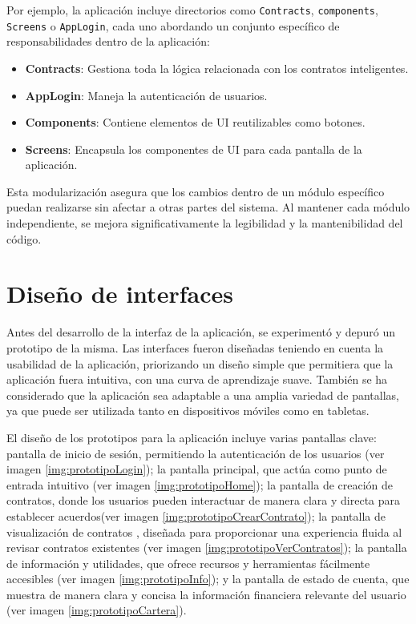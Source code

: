 Por ejemplo, la aplicación incluye directorios como \texttt{Contracts}, \texttt{components}, \texttt{Screens} o \texttt{AppLogin}, cada uno abordando un conjunto específico de responsabilidades dentro de la aplicación:

\begin{itemize}
\item \textbf{Contracts}: Gestiona toda la lógica relacionada con los contratos inteligentes.

\item \textbf{AppLogin}: Maneja la autenticación de usuarios.

\item \textbf{Components}: Contiene elementos de UI reutilizables como botones.

\item \textbf{Screens}: Encapsula los componentes de UI para cada pantalla de la aplicación.
\end{itemize}

Esta modularización asegura que los cambios dentro de un módulo específico puedan realizarse sin afectar a otras partes del sistema. Al mantener cada módulo independiente, se mejora significativamente la legibilidad y la mantenibilidad del código.

\section{Diseño de interfaces}

Antes del desarrollo de la interfaz de la aplicación, se experimentó y depuró un prototipo de la misma.
Las interfaces fueron diseñadas teniendo en cuenta la usabilidad de la aplicación, priorizando un diseño simple que permitiera que la aplicación fuera intuitiva, con una curva de aprendizaje suave.
También se ha considerado que la aplicación sea adaptable a una amplia variedad de pantallas, ya que puede ser utilizada tanto en dispositivos móviles como en tabletas.

El diseño de los prototipos para la aplicación incluye varias pantallas clave: pantalla de inicio de sesión, permitiendo la autenticación de los usuarios (ver imagen \ref{img:prototipoLogin}); la pantalla principal, que actúa como punto de entrada intuitivo (ver imagen \ref{img:prototipoHome}); la pantalla de creación de contratos, donde los usuarios pueden interactuar de manera clara y directa para establecer acuerdos(ver imagen \ref{img:prototipoCrearContrato}); la pantalla de visualización de contratos , diseñada para proporcionar una experiencia fluida al revisar contratos existentes (ver imagen \ref{img:prototipoVerContratos}); la pantalla de información y utilidades, que ofrece recursos y herramientas fácilmente accesibles (ver imagen \ref{img:prototipoInfo}); y la pantalla de estado de cuenta, que muestra de manera clara y concisa la información financiera relevante del usuario (ver imagen \ref{img:prototipoCartera}). 

